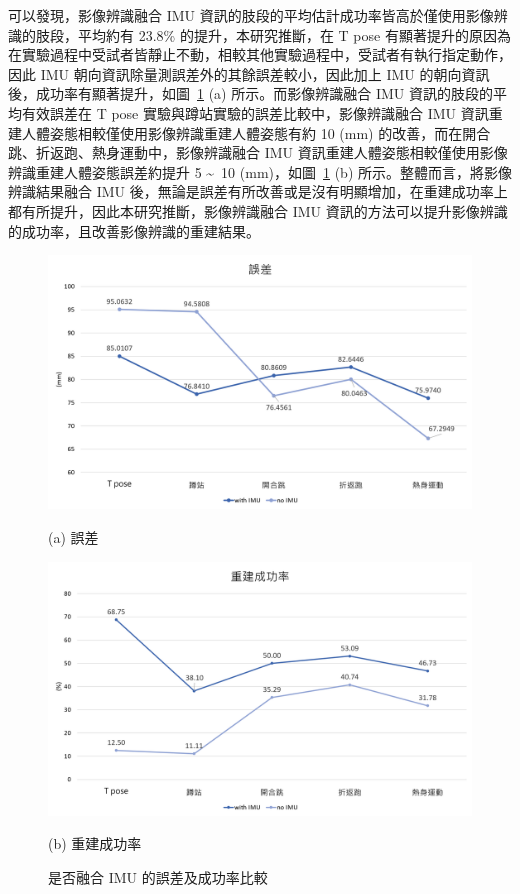 可以發現，影像辨識融合 IMU 資訊的肢段的平均估計成功率皆高於僅使用影像辨識的肢段，平均約有 23.8\% 的提升，本研究推斷，在 T pose 有顯著提升的原因為在實驗過程中受試者皆靜止不動，相較其他實驗過程中，受試者有執行指定動作，因此 IMU 朝向資訊除量測誤差外的其餘誤差較小，因此加上 IMU 的朝向資訊後，成功率有顯著提升，如圖~\ref{ch4_fig_error_success} (a) 所示。而影像辨識融合 IMU 資訊的肢段的平均有效誤差在 T pose 實驗與蹲站實驗的誤差比較中，影像辨識融合 IMU 資訊重建人體姿態相較僅使用影像辨識重建人體姿態有約 10 (mm) 的改善，而在開合跳、折返跑、熱身運動中，影像辨識融合 IMU 資訊重建人體姿態相較僅使用影像辨識重建人體姿態誤差約提升 5 \textasciitilde\ 10 (mm)，如圖~\ref{ch4_fig_error_success} (b) 所示。整體而言，將影像辨識結果融合 IMU 後，無論是誤差有所改善或是沒有明顯增加，在重建成功率上都有所提升，因此本研究推斷，影像辨識融合 IMU 資訊的方法可以提升影像辨識的成功率，且改善影像辨識的重建結果。

\begin{figure}[!ht]
   \centering
   \begin{minipage}{\textwidth}
     \centering
     \includegraphics[width=\linewidth]{figure/ch4_fig_error.png}
     \caption*{(a) 誤差}
   \end{minipage}
   \begin{minipage}{\textwidth}
      \centering
      \includegraphics[width=\linewidth]{figure/ch4_fig_success.png}
      \caption*{(b) 重建成功率}
   \end{minipage}
   \caption[是否融合 IMU 的誤差及成功率比較]{是否融合 IMU 的誤差及成功率比較}
   \label{ch4_fig_error_success}
\end{figure}


